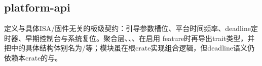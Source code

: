 
\subsection{platform-api}

定义与具体ISA/固件无关的板级契约：引导参数槽位、平台时间频率、deadline定时器、早期控制台与系统复位。聚合层、、、在启用 feature时再导出trait类型，并把中的具体结构体别名为/等；模块虽在根crate实现组合逻辑，但deadline语义仍依赖本crate的与。


